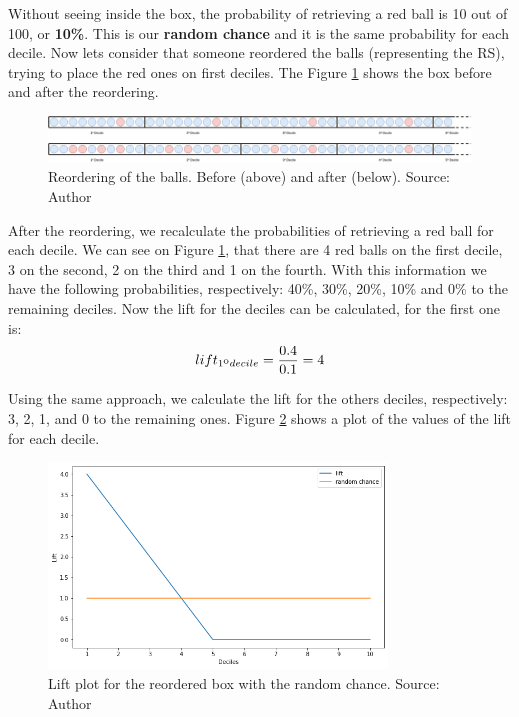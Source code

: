 Without seeing inside the box, the probability of retrieving a red ball is 10 out of 100, or \textbf{10\%}. This is our \textbf{random chance} and it is the same probability for each decile. Now lets consider that someone reordered the balls (representing the RS), trying to place the red ones on first deciles. The Figure \ref{fig:rec-box-ordering} shows the box before and after the reordering.

\begin{figure}[h]
   \centering
   \includegraphics[width=\linewidth]{fig/ch2-rec-box-ordering.jpg}
   \caption{Reordering of the balls. Before (above) and after (below). Source: Author}
   \label{fig:rec-box-ordering}
\end{figure}

After the reordering, we recalculate the probabilities of retrieving a red ball for each decile. We can see on Figure \ref{fig:rec-box-ordering}, that there are 4 red balls on the first decile, 3 on the second, 2 on the third and 1 on the fourth. With this information we have the following probabilities, respectively: 40\%, 30\%, 20\%, 10\% and 0\% to the remaining deciles. Now the lift for the deciles can be calculated, for the first one is:
\begin{equation}
	lift_{1\textsuperscript{o} decile} = \frac{0.4}{0.1} = 4
\end{equation}

Using the same approach, we calculate the lift for the others deciles, respectively: 3, 2, 1, and 0 to the remaining ones. Figure \ref{fig:lift-plot} shows a plot of the values of the lift for each decile.

\begin{figure}[h]
   \centering
   \includegraphics[width=9cm]{fig/ch2-lift-plot.png}
   \caption{Lift plot for the reordered box with the random chance. Source: Author}
   \label{fig:lift-plot}
\end{figure}

